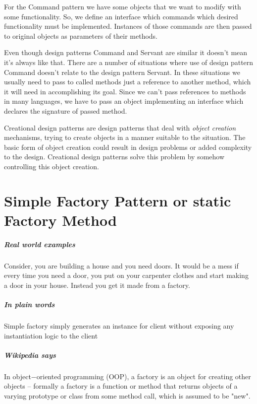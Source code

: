 \documentclass{book}
\newcounter{subpart}
\begin{document}
    For the Command pattern we have some objects that we want to modify with some functionality.
    So, we define an interface which commands which desired functionality must be implemented.
    Instances of those commands are then passed to original objects as parameters of their methods.

Even though design patterns Command and Servant are similar it doesn’t mean it’s always like that.
There are a number of situations where use of design pattern Command doesn’t relate to the design pattern Servant.
In these situations we usually need to pass to called methods just a reference to another method, which it will need in accomplishing its goal.
Since we can’t pass references to methods in many languages, we have to pass an object implementing an interface which declares the signature of passed method.

Creational design patterns are design patterns that deal with \textit{object creation} mechanisms, trying to create objects in a manner suitable to the situation.
The basic form of object creation could result in design problems or added complexity to the design. Creational design patterns solve this problem by somehow controlling this object creation.
\chapter{Simple Factory Pattern or static Factory Method}\label{StaticFactoryMethod}

\paragraph{Real world examples}
    Consider, you are building a house and you need doors. It would be a mess if every time you need a door, you put on your carpenter clothes and start making a door in your house.
    Instead you get it made from a factory.
\paragraph{In plain words}
    Simple factory simply generates an instance for client without exposing any instantiation logic to the client
\paragraph{Wikipedia says}
    In object$-$oriented programming (OOP), a factory is an object for creating other objects $–$
    formally a factory is a function or method that returns objects of a varying prototype or class from some method call, which is assumed to be "new".
\end{document}
